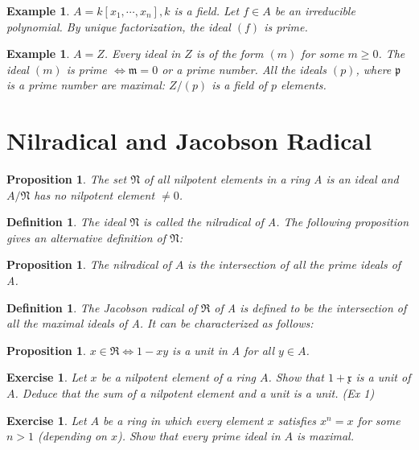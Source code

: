 \documentclass[]{report}
\newtheorem{prop}[theorem]{Proposition}
\newtheorem{defn}[theorem]{Definition}
\newtheorem{examples}[theorem]{Example}
\newtheorem{exercise}[theorem]{Exercise}
\begin{document}
\begin{examples}
     $A = k[x_1, \cdots, x_n], k$ is a field. Let $f\in A$ be an irreducible polynomial. By unique factorization, the ideal $(f)$ is prime. 
 \end{examples}
 \begin{examples}
 $A = Z$. Every ideal in $Z$ is of the form $(m)$ for some $m\geq 0$. The ideal $(m)$ is prime $\Leftrightarrow \mathfrak{m} = 0$ or a prime number. All the ideals $(p)$, where $\mathfrak{p}$ is a prime number are maximal: $Z/(p)$ is a field of $p$ elements.
\end{examples}

\section{Nilradical and Jacobson Radical}

\begin{prop}
    The set $\mathfrak{N}$ of all nilpotent elements in a ring A is an ideal and $A/\mathfrak{N}$ has no nilpotent element $\neq 0$.
\end{prop}

\begin{defn}
    The ideal $\mathfrak{N}$ is called the nilradical of A. The following proposition gives an alternative definition of $\mathfrak{N}$:
\end{defn}

\begin{prop}
    The nilradical of $A$ is the intersection of all the prime ideals of A.
\end{prop}

\begin{defn}
    The Jacobson radical of $\mathfrak{R}$ of A is defined to be the intersection of all the maximal ideals of A. It can be characterized as follows:
\end{defn}

\begin{prop}
    $x\in \mathfrak{R} \Leftrightarrow 1-xy$ is a unit in A for all $y\in A$.
\end{prop}

\begin{exercise}
    Let $x$ be a nilpotent element of a ring $A$. Show that $\mathfrak{1+x}$ is a unit of $A$. Deduce that the sum of a nilpotent element and a unit is a unit. (Ex 1)
\end{exercise}

\begin{exercise}
    Let $A$ be a ring in which every element $x$ satisfies $x^n=x$ for some $n>1$ (depending on $x$). Show that every prime ideal in $A$ is maximal.
\end{exercise}
\end{document}
